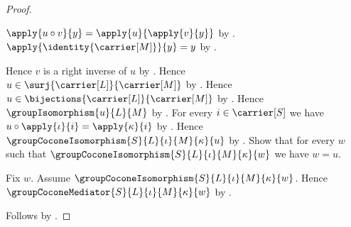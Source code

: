 \begin{proof}
\begin{subproof}
        $\apply{u\circ v}{y}=\apply{u}{\apply{v}{y}}$ by
            .
        $\apply{\identity{\carrier[M]}}{y}=y$ by
            .
    \end{subproof}
    Hence $v$ is a right inverse of $u$ by
        .
    Hence $u\in\surj{\carrier[L]}{\carrier[M]}$ by
        .
    Hence $u\in\bijections{\carrier[L]}{\carrier[M]}$ by
        .
    Hence $\groupIsomorphism{u}{L}{M}$ by
        .
    For every $i\in\carrier[S]$ we have
        $u\circ\apply{\iota}{i}=\apply{\kappa}{i}$ by
        .
    Hence $\groupCoconeIsomorphism{S}{L}{\iota}{M}{\kappa}{u}$ by
        .
    Show that for every $w$ such that
        $\groupCoconeIsomorphism{S}{L}{\iota}{M}{\kappa}{w}$
    we have $w=u$.
    \begin{subproof}
        Fix $w$.
        Assume $\groupCoconeIsomorphism{S}{L}{\iota}{M}{\kappa}{w}$.
        Hence $\groupCoconeMediator{S}{L}{\iota}{M}{\kappa}{w}$ by
            .
    \end{subproof}
    Follows by \auto.
\end{proof}
